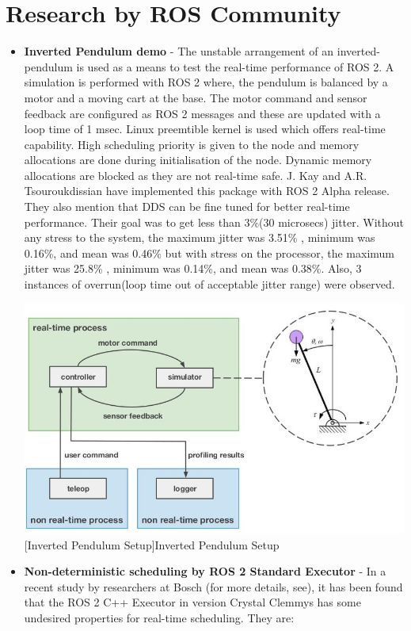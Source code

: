 \documentclass[%
xelatex,
	oneside,		%
	12pt,			%
	parskip=half,	%
	abstracton,
	chapterprefix=true%
    appendixprefix=true]
{scrbook}
\begin{document}
	\section{Research by ROS Community}
\vspace*{0.5cm}
\begin{itemize}
\item {\bfseries Inverted Pendulum demo} - The unstable arrangement of an inverted-pendulum is used as a means to test  the real-time performance of ROS 2. A simulation is performed with ROS 2 where, the pendulum is balanced by a motor and a moving cart at the base. The motor command and sensor feedback are configured as ROS 2 messages and these are updated with a loop time of 1 msec. Linux preemtible kernel is used which offers real-time capability. High scheduling priority is given to the node and memory allocations are done during initialisation of the node. Dynamic memory allocations are blocked as they are not real-time safe. J. Kay and A.R. Tsouroukdissian have implemented this package with ROS 2 Alpha release. They also mention that DDS can be fine tuned for better real-time performance. Their goal was to get less than 3\%(30 microsecs) jitter. Without any stress to the system, the maximum jitter was 3.51\% , minimum was 0.16\%, and mean was 0.46\% but with stress on the processor, the maximum jitter was 25.8\% , minimum was 0.14\%, and mean was 0.38\%. Also, 3 instances of overrun(loop time out of acceptable jitter range) were observed.
	\begin{center}
\includegraphics[scale=0.5]{fig/inverted.jpg}
[Inverted Pendulum Setup]{Inverted Pendulum Setup\cite{deadline}}
\label{fig:inverpen}
\end{center}
\item {\bfseries Non-deterministic scheduling by ROS 2 Standard Executor} - In a recent study by researchers at Bosch (for more details, see\cite{ingo}), it has been found that the ROS 2 C++ Executor in version Crystal Clemmys has some undesired properties for real-time scheduling. They are:

\end{itemize}
\end{document}
